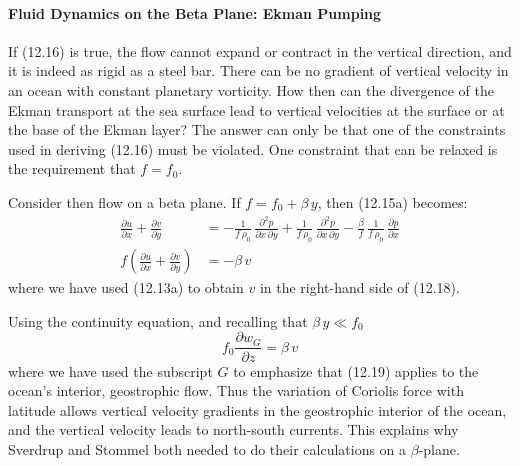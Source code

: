 \paragraph{Fluid Dynamics on the Beta Plane: Ekman Pumping}
If (12.16) is true, the flow cannot expand or contract in the vertical
direction, and it is indeed as rigid as a steel bar. There can be no gradient of
vertical velocity in an ocean with constant planetary vorticity. How then can the
divergence of the Ekman transport at the sea surface lead to vertical
velocities at the surface or at the base of the Ekman layer? The answer can only be that one
of the constraints used in deriving (12.16) must be violated. One constraint that can be
relaxed is the requirement that $f = f_0$.

Consider then flow on  a beta plane. If $f = f_0 + \beta\,y$, then (12.15a)
becomes:
\begin{align}
\frac{\partial{u}}{\partial{x}} + \frac{\partial{v}}{\partial{y}} &= - \frac{1}{f\,\rho_{0}}\, \frac{\partial ^2 p}{\partial{x}\,\partial{y}} +
\frac{1}{f\,\rho_{0}} \, \frac{\partial ^2 p}{\partial{x}\,\partial{y}} - \frac{\beta}{f} \,\frac{1}{f\,\rho_{0}}\,\frac{\partial{p}}{\partial{x}} \\
f \left( \frac{\partial{u}}{\partial{x}} + \frac{\partial{v}}{\partial{y}} \right) &= - \beta \, v
\end{align}
where we have used (12.13a) to obtain $v$ in the right-hand side of (12.18).

Using the continuity equation, and recalling that $\beta\, y \ll f_0$
\begin{equation}
f_0 \frac{\partial{w_G}}{\partial{z}} = \beta \, v
\end{equation}
where we have used the subscript $G$ to emphasize that (12.19) applies to the
ocean's interior, geostrophic flow. Thus the
variation of Coriolis force with latitude allows vertical velocity gradients in the
geostrophic interior of the ocean, and the vertical velocity leads to north-south currents.
This explains why Sverdrup and Stommel both needed to do their calculations on a
$\beta$-plane.

